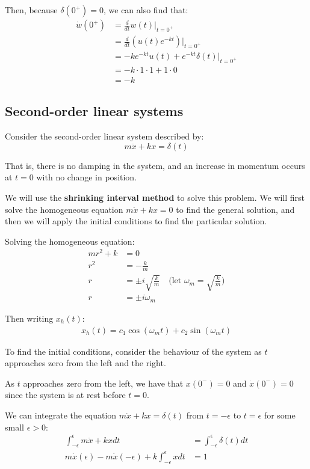 Then, because $\delta(0^+) = 0$, we can also find that:
\begin{align*}
\dot{w}(0^+) &= \frac{d}{dt} w(t)  \bigg|_{t=0^+} \\
&= \frac{d}{dt} (u(t)e^{-kt}) \bigg|_{t=0^+} \\
&= -ke^{-kt}u(t) + e^{-kt} \delta(t) \bigg|_{t=0^+} \\
&= -k \cdot 1 \cdot 1 + 1 \cdot 0 \\
&= -k
\end{align*}

\subsection{Second-order linear systems}
Consider the second-order linear system described by:
\[
m \ddot{x} + kx = \delta (t)
\]

That is, there is no damping in the system, and an increase in momentum occurs at $t = 0$ with no change in position.

We will use the \textbf{shrinking interval method} to solve this problem. We will first solve the homogeneous equation $m \ddot{x} + kx = 0$ to find the general solution, and then we will apply the initial conditions to find the particular solution.

Solving the homogeneous equation:
\begin{align*}
m r^2 + k &= 0 \\
r^2 &= -\frac{k}{m} \\
r &= \pm i \sqrt{\frac{k}{m}} \quad \text{(let } \omega_m = \sqrt{\frac{k}{m}} \text{)} \\
r &= \pm i \omega_m
\end{align*}

Then writing $x_h(t)$:
\begin{align*}
x_h(t) = c_1 \cos (\omega_m t) + c_2 \sin (\omega_m t)
\end{align*}

To find the initial conditions, consider the behaviour of the system as $t$ approaches zero from the left and the right.

As $t$ approaches zero from the left, we have that $x(0^-) = 0$ and $\dot{x}(0^-) = 0$ since the system is at rest before $t = 0$.

We can integrate the equation $m \ddot{x} + kx = \delta (t)$ from $t = -\epsilon$ to $t = \epsilon$ for some small $\epsilon > 0$:
\begin{align*}
\int_{-\epsilon}^{\epsilon} m \ddot{x} + kx dt &= \int_{-\epsilon}^{\epsilon} \delta (t) dt \\
m \dot{x}(\epsilon) - m \dot{x}(-\epsilon) + k \int_{-\epsilon}^{\epsilon} x dt &= 1
\end{align*}

